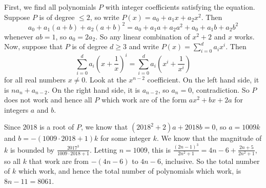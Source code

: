 First, we find all polynomials $P$ with integer coefficients satisfying the equation. Suppose $P$ is of degree $\leq2$, so write $P\left(x\right)=a_0+a_1x+a_2x^2$. Then \[a_0+a_1\left(a+b\right)+a_2\left(a+b\right)^2=a_0+a_1a+a_2a^2+a_0+a_1b+a_2b^2\] whenever $ab=1$, so $a_0=2a_2$. So any linear combination of $x^2+2$ and $x$ works. Now, suppose that $P$ is of degree $d\geq3$ and write $P\left(x\right)=\displaystyle\sum_{i=0}^da_ix^i$. Then \[\displaystyle\sum_{i=0}^da_i\left(x+\frac{1}{x}\right)^i=\displaystyle\sum_{i=0}^da_i\left(x^i+\frac{1}{x^i}\right)\] for all real numbers $x\neq0$. Look at the $x^{n-2}$ coefficient. On the left hand side, it is $na_n+a_{n-2}$. On the right hand side, it is $a_{n-2}$, so $a_n=0$, contradiction. So $P$ does not work and hence all $P$ which work are of the form $ax^2+bx+2a$ for integers $a$ and $b$.

Since $2018$ is a root of $P$, we know that $\left(2018^2+2\right)a+2018b=0$, so $a=1009k$ and $b=-\left(1009\cdot2018+1\right)k$ for some integer $k$. We know that the magnitude of $k$ is bounded by $\frac{2017^3}{1009\cdot2018+1}$. Letting $n=1009$, this is $\frac{\left(2n-1\right)^3}{2n^2+1}=4n-6+\frac{2n+5}{2n^2+1}$, so all $k$ that work are from $-\left(4n-6\right)$ to $4n-6$, inclusive. So the total number of $k$ which work, and hence the total number of polynomials which work, is $8n-11=\boxed{8061}$.